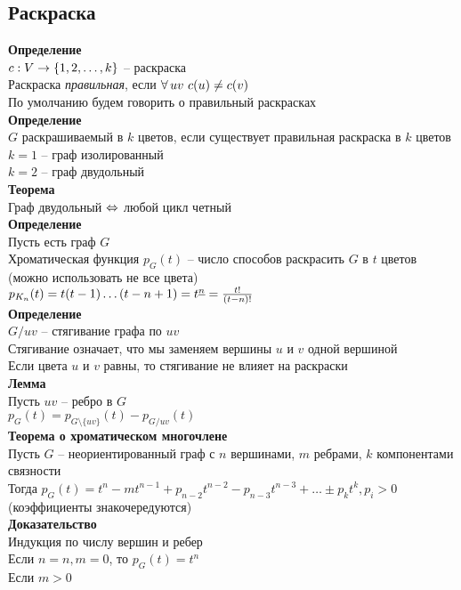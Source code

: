 \documentclass[12pt]{article}
\begin{document}
\subsection{Раскраска}
\textbf{Определение}\\
$c: V \rightarrow \{1,2, \ldots, k\}$ -- раскраска\\
Раскраска \textit{правильная}, если $\fall uv\ c(u) \neq c(v)$\\
По умолчанию будем говорить о правильный раскрасках\\
\textbf{Определение}\\
$G$ раскрашиваемый в $k$ цветов, если существует правильная раскраска в $k$ цветов\\
$k=1$ -- граф изолированный\\
$k=2$ -- граф двудольный\\
\textbf{Теорема}\\
Граф двудольный $\Leftrightarrow$ любой цикл четный\\
\textbf{Определение}\\
Пусть есть граф $G$\\
Хроматическая функция $p_G(t)$ -- число способов раскрасить $G$ в $t$ цветов (можно использовать не все цвета)\\
$p_{K_n}(t)=t(t-1)\ldots(t-n+1) = t^{\underline n} = \frac{t!}{(t-n)!}$\\
\textbf{Определение}\\
$G / uv$ -- стягивание графа по $uv$\\
Стягивание означает, что мы заменяем вершины $u$ и $v$ одной вершиной\\
Если цвета $u$ и $v$ равны, то стягивание не влияет на раскраски\\
\textbf{Лемма}\\
Пусть $uv$ -- ребро в $G$\\
$p_G(t) = p_{G\setminus\{uv\}}(t) - p_{G/uv}(t)$\\
\textbf{Теорема о хроматическом многочлене}\\
Пусть $G$ -- неориентированный граф с $n$ вершинами, $m$ ребрами, $k$ компонентами связности\\
Тогда $p_G(t) = t^n - m t^{n-1} + p_{n-2}t^{n-2} - p_{n-3}t^{n-3} + \ldots \pm p_kt^k, p_i > 0$ (коэффициенты знакочередуются)\\
\textbf{Доказательство}\\
Индукция по числу вершин и ребер\\
Если $n = n, m=0$, то $p_G(t) = t^n$\\
Если $m > 0$\\
\end{document}
